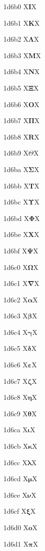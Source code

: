 \documentclass[11pt]{article}
\begin{document}
1d6b0 X{\ensuremath{\mathbf{I}}}X

1d6b1 X{\ensuremath{\mathbf{K}}}X

1d6b2 X{\ensuremath{\mathbf{\Lambda}}}X

1d6b3 X{\ensuremath{\mathbf{M}}}X

1d6b4 X{\ensuremath{\mathbf{N}}}X

1d6b5 X{\ensuremath{\mathbf{\Xi}}}X

1d6b6 X{\ensuremath{\mathbf{O}}}X

1d6b7 X{\ensuremath{\mathbf{\Pi}}}X

1d6b8 X{\ensuremath{\mathbf{R}}}X

1d6b9 X{\ensuremath{\mathbf{\varTheta}}}X

1d6ba X{\ensuremath{\mathbf{\Sigma}}}X

1d6bb X{\ensuremath{\mathbf{T}}}X

1d6bc X{\ensuremath{\mathbf{\Upsilon}}}X

1d6bd X{\ensuremath{\mathbf{\Phi}}}X

1d6be X{\ensuremath{\mathbf{X}}}X

1d6bf X{\ensuremath{\mathbf{\Psi}}}X

1d6c0 X{\ensuremath{\mathbf{\Omega}}}X

1d6c1 X{\ensuremath{\mathbf{\nabla}}}X

1d6c2 X{\ensuremath{\mathbf{\alpha}}}X

1d6c3 X{\ensuremath{\mathbf{\beta}}}X

1d6c4 X{\ensuremath{\mathbf{\gamma}}}X

1d6c5 X{\ensuremath{\mathbf{\delta}}}X

1d6c6 X{\ensuremath{\mathbf{\varepsilon}}}X

1d6c7 X{\ensuremath{\mathbf{\zeta}}}X

1d6c8 X{\ensuremath{\mathbf{\eta}}}X

1d6c9 X{\ensuremath{\mathbf{\theta}}}X

1d6ca X{\ensuremath{\mathbf{\iota}}}X

1d6cb X{\ensuremath{\mathbf{\kappa}}}X

1d6cc X{\ensuremath{\mathbf{\lambda}}}X

1d6cd X{\ensuremath{\mathbf{\mu}}}X

1d6ce X{\ensuremath{\mathbf{\nu}}}X

1d6cf X{\ensuremath{\mathbf{\xi}}}X

1d6d0 X{\ensuremath{\mathbf{o}}}X

1d6d1 X{\ensuremath{\mathbf{\pi}}}X
\end{document}
